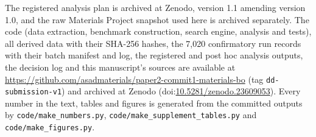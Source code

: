 The registered analysis plan is archived at Zenodo, version 1.1\cite{asad2026registration} amending version
1.0\cite{asad2026registrationv1}, and the raw Materials Project snapshot used here is archived separately\cite{asad2026snapshot}.
The code (data extraction, benchmark construction, search engine, analysis and tests), all derived data with their SHA-256
hashes, the 7,020 confirmatory run records with their batch manifest and log, the registered and post hoc analysis outputs, the
decision log and this manuscript's sources are available at \url{https://github.com/asadmaterials/paper2-commit1-materials-bo}
(tag \texttt{dd-submission-v1}) and archived at Zenodo (doi:\href{https://doi.org/10.5281/zenodo.23609053}{10.5281/zenodo.23609053}). Every number in the text, tables and
figures is generated from the committed outputs by \texttt{code/make\_numbers.py}, \texttt{code/make\_supplement\_tables.py} and
\texttt{code/make\_figures.py}.
